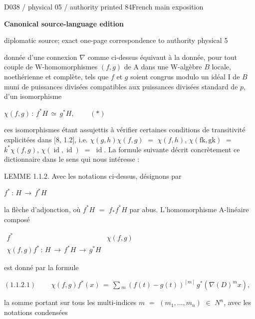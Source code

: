 \documentclass[9pt]{article}
\newcommand{\CanonText}[1]{\par{\fontsize{8.0}{9.35}\selectfont\RaggedRight #1\par}\vspace{2.2pt}}
\newcommand{\CanonDisplay}[1]{\par\vspace{1.2pt}\begin{center}{\fontsize{7.2}{8.4}\selectfont\(\displaystyle #1\)}\end{center}\vspace{1.2pt}}
\newenvironment{CanonMathBlock}{\par\vspace{1.2pt}\begin{center}\fontsize{6.8}{8.0}\selectfont\(\displaystyle}{\)\end{center}\vspace{1.2pt}}
\newcommand{\LayerTitle}{Canonical source-language edition}
\begin{document}
\newpage
\noindent\begin{minipage}[t][\dimexpr\textheight-5pt\relax][t]{\textwidth}
{\sffamily\fontsize{7.3}{8.2}\selectfont\color{Quiet} D038 / physical 05 / authority printed 84\hfill French main exposition}
\par{}\vspace{4.5pt}
{\sffamily\fontsize{10.4}{11.6}\selectfont\bfseries\color{Accent} \LayerTitle}
\par{\sffamily\fontsize{6.7}{7.7}\selectfont\color{Quiet} diplomatic source; exact one-page correspondence to authority physical 5}
\vspace{5pt}
\CanonText{donnée d'une connexion \(\nabla{}\) comme ci-dessus équivaut à la donnée, pour tout couple de W-homomorphismes \((f,g)\) de A dans une W-algèbre \(B\) locale, noethérienne et complète, tels que \(f\) et \(g\) soient congrus modulo un idéal I de \(B\) muni de puissances divisées compatibles aux puissances divisées standard de \(p\), d'un isomorphisme}
\CanonDisplay{\chi{}(f,g)\,:\,f^{*}H\,\simeq{}\,g^{*}H,\qquad\,(*)}
\CanonText{ces isomorphismes étant assujettis à vérifier certaines conditions de transitivité explicitées dans [8, 1.2], i.e. \(\chi{}(g,h)\chi{}(f,g)\) \(=\) \(\chi{}(f,h)\), \(\chi{}(\text{fk},\text{gk})\) \(=\) \(k^{*}\chi{}(f,g)\), \(\chi{}(\operatorname{id},\operatorname{id})\) \(=\) \(\operatorname{id}\). La formule suivante décrit concrètement ce dictionnaire dans le sens qui nous intéresse :}
\CanonText{LEMME 1.1.2. Avec les notations ci-dessus, désignons par}
\CanonDisplay{f^{*}\,:\,H\,\to{}\,f^{*}H}
\CanonText{la flèche d'adjonction, où \(f^{*}H\) \(=\) \(f_*f^{*}H\) par abus. L'homomorphisme A-linéaire composé}
\begin{CanonMathBlock}
\begin{array}{cc}
f^{*} & \chi{}(f,g)\\
\chi{}(f,g)f^{*}\,:\,H\,\longrightarrow{}\,f^{*}H\,\longrightarrow{}\,g^{*}H & {}
\end{array}
\end{CanonMathBlock}
\CanonText{est donné par la formule}
\CanonDisplay{(1.1.2.1)\qquad\,\chi{}(f,g)f^{*}(x)\,=\,\sum{}_{m}\,(f(t)-g(t))^{[m]}\,g^{*}(\nabla{}(D)^{m}x),}
\CanonText{la somme portant sur tous les multi-indices \(m\) \(=\) \((m_{1},\ldots{},m_{n})\) \(\in{}\) \(N^{n}\), avec les notations condensées}

\end{minipage}
\end{document}
